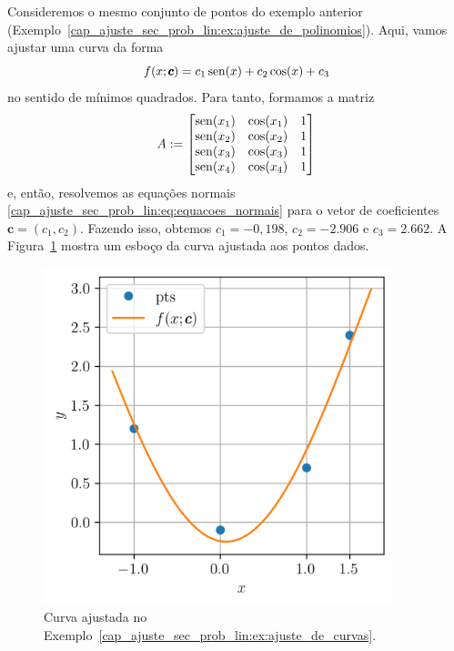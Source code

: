 \begin{ex}\label{cap_ajuste_sec_prob_lin:ex:ajuste_de_curvas}
  Consideremos o mesmo conjunto de pontos do exemplo anterior (Exemplo~\ref{cap_ajuste_sec_prob_lin:ex:ajuste_de_polinomios}). Aqui, vamos ajustar uma curva da forma
  \begin{equation}
    f(x; \pmb{c}) = c_1\operatorname{sen}(x) + c_2\cos(x) + c_3
  \end{equation}
no sentido de mínimos quadrados. Para tanto, formamos a matriz
\begin{equation}
  A :=
  \begin{bmatrix}
    \operatorname{sen}(x_1) & \cos(x_1) & 1 \\
    \operatorname{sen}(x_2) & \cos(x_2) & 1 \\
    \operatorname{sen}(x_3) & \cos(x_3) & 1 \\
    \operatorname{sen}(x_4) & \cos(x_4) & 1
  \end{bmatrix}
\end{equation}
  e, então, resolvemos as equações normais \eqref{cap_ajuste_sec_prob_lin:eq:equacoes_normais} para o vetor de coeficientes $\pmb{c} = (c_1, c_2)$. Fazendo isso, obtemos $c_1=-0,198$, $c_2=-2.906$ e $c_3=2.662$. A Figura~\ref{cap_ajuste_sec_prob_lin:fig:ex_ajuste_de_curvas} mostra um esboço da curva ajustada aos pontos dados.

  \begin{figure}[htb]
    \centering
    \includegraphics[width=4in]{cap_ajuste/dados/fig_mqCurva/fig.png}
    \caption{Curva ajustada no Exemplo~\ref{cap_ajuste_sec_prob_lin:ex:ajuste_de_curvas}.}
    \label{cap_ajuste_sec_prob_lin:fig:ex_ajuste_de_curvas}
  \end{figure}


\end{ex}
